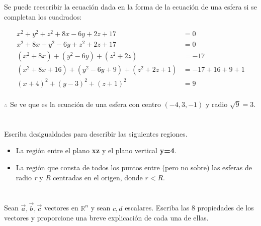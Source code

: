 \documentclass[12pt]{article}
\begin{document}
Se puede reescribir la ecuación dada en la forma de la ecuación de una esfera si se completan los cuadrados:

\begin{equation*}
  \begin{split}
    x^2 + y^2 + z^2 + 8x - 6y + 2z + 17 &= 0 \\
    x^2 + 8x + y^2 - 6y + z^2 + 2z + 17 &= 0 \\
    (x^2 + 8x) + (y^2 - 6y) + (z^2 + 2z) &= - 17 \\
    (x^2 + 8x + 16) + (y^2 - 6y + 9) + (z^2 + 2z + 1) &= - 17 + 16 + 9 + 1\\
    (x + 4)^2 + (y - 3)^2 + (z + 1)^2 &= 9 \\
  \end{split}
\end{equation*}

$\therefore $ Se ve que es la ecuación de una esfera con centro $(-4, 3, -1)$ y radio $\sqrt{9} = 3$.

\section{}

Escriba desigualdades para describir las siguientes regiones.

\begin{itemize}
    
\item La región entre el plano \textbf{xz} y el plano vertical \textbf{y=4}.
    
\item La región que consta de todos los puntos entre (pero no sobre) las esferas de radio \textit{r} y \textit{R} centradas en el origen, donde $r < R$.
    
\end{itemize}
  
\section{}

Sean $\vec{a} , \vec{b} , \vec{c}$ vectores en $\mathbb{R}^n$ y sean $c,d$ escalares. Escriba las 8 propiedades de los vectores y proporcione una breve explicación de cada una de ellas.
\end{document}
